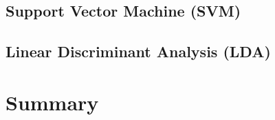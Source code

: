 \subsection{Support Vector Machine (SVM)}

\subsection{Linear Discriminant Analysis (LDA)}

\section*{Summary}